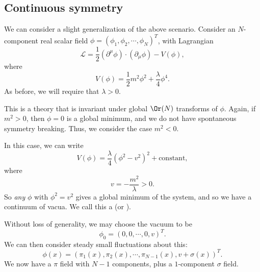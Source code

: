 \documentclass[a4paper]{article}
\begin{document}
\subsection{Continuous symmetry}
We can consider a slight generalization of the above scenario. Consider an $N$-component real scalar field $\phi = (\phi_1, \phi_2, \cdots, \phi_N)^T$, with Lagrangian
\[
  \mathcal{L} = \frac{1}{2} (\partial^\mu \phi) \cdot (\partial_\mu \phi) - V(\phi),
\]
where
\[
  V(\phi) = \frac{1}{2} m^2 \phi^2 + \frac{\lambda}{4} \phi^4.
\]
As before, we will require that $\lambda > 0$.

This is a theory that is invariant under global $\Or(N)$ transforms of $\phi$. Again, if $m^2 > 0$, then $\phi = 0$ is a global minimum, and we do not have spontaneous symmetry breaking. Thus, we consider the case $m^2 < 0$.

In this case, we can write
\[
  V(\phi) = \frac{\lambda}{4} (\phi^2 - v^2)^2 + \text{constant},
\]
where
\[
  v = -\frac{m^2}{\lambda} > 0.
\]
So \emph{any} $\phi$ with $\phi^2 = v^2$ gives a global minimum of the system, and so we have a continuum of vacua. We call this a  (or ).
\begin{center}
\end{center}
Without loss of generality, we may choose the vacuum to be
\[
  \phi_0 = (0, 0, \cdots, 0, v)^T.
\]
We can then consider steady small fluctuations about this:
\[
  \phi(x) = (\pi_1(x), \pi_2(x), \cdots, \pi_{N-1}(x), v + \sigma(x))^T.
\]
We now have a $\pi$ field with $N - 1$ components, plus a $1$-component $\sigma$ field.
\end{document}

